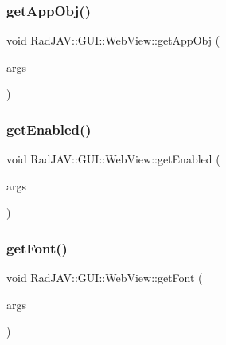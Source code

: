 \subsubsection{\texorpdfstring{get\+App\+Obj()}{getAppObj()}}
{\footnotesize\ttfamily void Rad\+J\+A\+V\+::\+G\+U\+I\+::\+Web\+View\+::get\+App\+Obj (\begin{DoxyParamCaption}\item[{const v8\+::\+Function\+Callback\+Info$<$ v8\+::\+Value $>$ \&}]{args }\end{DoxyParamCaption})\hspace{0.3cm}{\ttfamily [static]}}

\mbox{\label{class_rad_j_a_v_1_1_g_u_i_1_1_web_view_ada2e3911179cea0897fe48c4b52d56cd}} 
\subsubsection{\texorpdfstring{get\+Enabled()}{getEnabled()}}
{\footnotesize\ttfamily void Rad\+J\+A\+V\+::\+G\+U\+I\+::\+Web\+View\+::get\+Enabled (\begin{DoxyParamCaption}\item[{const v8\+::\+Function\+Callback\+Info$<$ v8\+::\+Value $>$ \&}]{args }\end{DoxyParamCaption})\hspace{0.3cm}{\ttfamily [static]}}

\mbox{\label{class_rad_j_a_v_1_1_g_u_i_1_1_web_view_a619a43459170555ae73ece65a99196e4}} 
\subsubsection{\texorpdfstring{get\+Font()}{getFont()}}
{\footnotesize\ttfamily void Rad\+J\+A\+V\+::\+G\+U\+I\+::\+Web\+View\+::get\+Font (\begin{DoxyParamCaption}\item[{const v8\+::\+Function\+Callback\+Info$<$ v8\+::\+Value $>$ \&}]{args }\end{DoxyParamCaption})\hspace{0.3cm}{\ttfamily [static]}}

